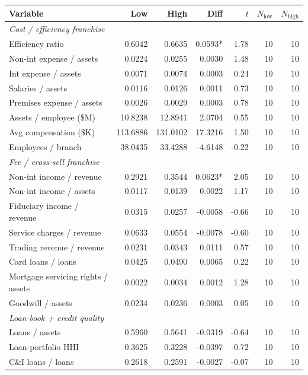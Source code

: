 \begin{tabular}{lrrrrrr}
\toprule
Variable & Low & High & Diff & $t$ & $N_{\text{low}}$ & $N_{\text{high}}$ \\
\midrule
\multicolumn{7}{l}{\emph{Cost / efficiency franchise}} \\
\midrule
Efficiency ratio & 0.6042 & 0.6635 & 0.0593* & 1.78 & 10 & 10 \\
Non-int expense / assets & 0.0224 & 0.0255 & 0.0030 & 1.48 & 10 & 10 \\
Int expense / assets & 0.0071 & 0.0074 & 0.0003 & 0.24 & 10 & 10 \\
Salaries / assets & 0.0116 & 0.0126 & 0.0011 & 0.73 & 10 & 10 \\
Premises expense / assets & 0.0026 & 0.0029 & 0.0003 & 0.78 & 10 & 10 \\
Assets / employee (\$M) & 10.8238 & 12.8941 & 2.0704 & 0.55 & 10 & 10 \\
Avg compensation (\$K) & 113.6886 & 131.0102 & 17.3216 & 1.50 & 10 & 10 \\
Employees / branch & 38.0435 & 33.4288 & -4.6148 & -0.22 & 10 & 10 \\
\midrule
\multicolumn{7}{l}{\emph{Fee / cross-sell franchise}} \\
\midrule
Non-int income / revenue & 0.2921 & 0.3544 & 0.0623* & 2.05 & 10 & 10 \\
Non-int income / assets & 0.0117 & 0.0139 & 0.0022 & 1.17 & 10 & 10 \\
Fiduciary income / revenue & 0.0315 & 0.0257 & -0.0058 & -0.66 & 10 & 10 \\
Service charges / revenue & 0.0633 & 0.0554 & -0.0078 & -0.60 & 10 & 10 \\
Trading revenue / revenue & 0.0231 & 0.0343 & 0.0111 & 0.57 & 10 & 10 \\
Card loans / loans & 0.0425 & 0.0490 & 0.0065 & 0.22 & 10 & 10 \\
Mortgage servicing rights / assets & 0.0022 & 0.0034 & 0.0012 & 1.28 & 10 & 10 \\
Goodwill / assets & 0.0234 & 0.0236 & 0.0003 & 0.05 & 10 & 10 \\
\midrule
\multicolumn{7}{l}{\emph{Loan-book + credit quality}} \\
\midrule
Loans / assets & 0.5960 & 0.5641 & -0.0319 & -0.64 & 10 & 10 \\
Loan-portfolio HHI & 0.3625 & 0.3228 & -0.0397 & -0.72 & 10 & 10 \\
C\&I loans / loans & 0.2618 & 0.2591 & -0.0027 & -0.07 & 10 & 10 \\

\end{tabular}
